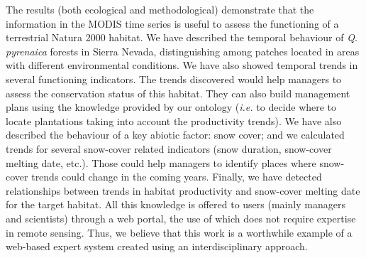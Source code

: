 The results (both ecological and methodological) demonstrate that the information in the MODIS time series is useful to assess the functioning of a terrestrial Natura 2000 habitat. We have described the temporal behaviour of \emph{Q. pyrenaica} forests in Sierra Nevada, distinguishing among patches located in areas with different environmental conditions. We have also showed temporal trends in several functioning indicators. The trends discovered would help managers to assess the conservation status of this habitat. They can also build management plans using the knowledge provided by our ontology (\emph{i.e.} to decide where to locate plantations taking into account the productivity trends). We have also described the behaviour of a key abiotic factor: snow cover; and we calculated trends for several snow-cover related indicators (snow duration, snow-cover melting date, etc.). Those could help managers to identify places where snow-cover trends could change in the coming years. Finally, we have detected relationships between trends in habitat productivity and snow-cover melting date for the target habitat. All this knowledge is offered to users (mainly managers and scientists) through a web portal, the use of which does not require expertise in remote sensing. Thus, we believe that this work is a worthwhile example of a web-based expert system created using an interdisciplinary approach.

